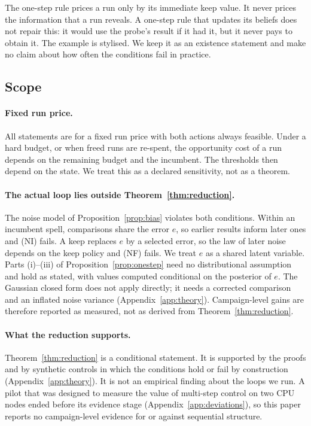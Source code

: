 The one-step rule prices a run only by its immediate keep value. It never prices the information that a run reveals. A one-step rule that updates its beliefs does not repair this: it would use the probe's result if it had it, but it never pays to obtain it. The example is stylised. We keep it as an existence statement and make no claim about how often the conditions fail in practice.

\subsection{Scope}
\label{app:theory-scope}

\paragraph{Fixed run price.}
All statements are for a fixed run price with both actions always feasible. Under a hard budget, or when freed runs are re-spent, the opportunity cost of a run depends on the remaining budget and the incumbent. The thresholds then depend on the state. We treat this as a declared sensitivity, not as a theorem.

\paragraph{The actual loop lies outside Theorem~\ref{thm:reduction}.}
The noise model of Proposition~\ref{prop:bias} violates both conditions. Within an incumbent spell, comparisons share the error $e$, so earlier results inform later ones and (NI) fails. A keep replaces $e$ by a selected error, so the law of later noise depends on the keep policy and (NF) fails. We treat $e$ as a shared latent variable. Parts (i)--(iii) of Proposition~\ref{prop:onestep} need no distributional assumption and hold as stated, with values computed conditional on the posterior of $e$. The Gaussian closed form does not apply directly; it needs a corrected comparison and an inflated noise variance (Appendix~\ref{app:theory}). Campaign-level gains are therefore reported as measured, not as derived from Theorem~\ref{thm:reduction}.

\paragraph{What the reduction supports.}
Theorem~\ref{thm:reduction} is a conditional statement. It is supported by the proofs and by synthetic controls in which the conditions hold or fail by construction (Appendix~\ref{app:theory}). It is not an empirical finding about the loops we run. A pilot that was designed to measure the value of multi-step control on two CPU nodes ended before its evidence stage (Appendix~\ref{app:deviations}), so this paper reports no campaign-level evidence for or against sequential structure.

